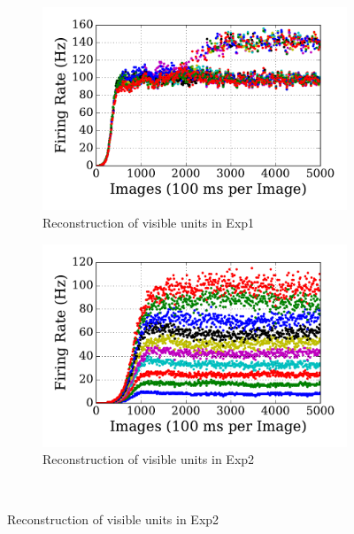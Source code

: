 \begin{figure}
\DIFdelendFL \DIFaddbeginFL \begin{subfigure}[t]{0.48\textwidth}
		\DIFaddendFL \includegraphics[width=\textwidth]{pics_sdlm/10_exp_SRBM_Orig/exp1_recon_s.pdf}
		\caption{Reconstruction of visible units in Exp1}
	\end{subfigure}
	\DIFdelbeginFL %
\DIFdelendFL \DIFaddbeginFL \begin{subfigure}[t]{0.48\textwidth}
		\DIFaddendFL \includegraphics[width=\textwidth]{pics_sdlm/10_exp_SRBM_Orig/exp2_recon_s.pdf}
		\caption{Reconstruction of visible units in Exp2}
	\end{subfigure}\\
	\DIFdelbeginFL %

\end{figure}

